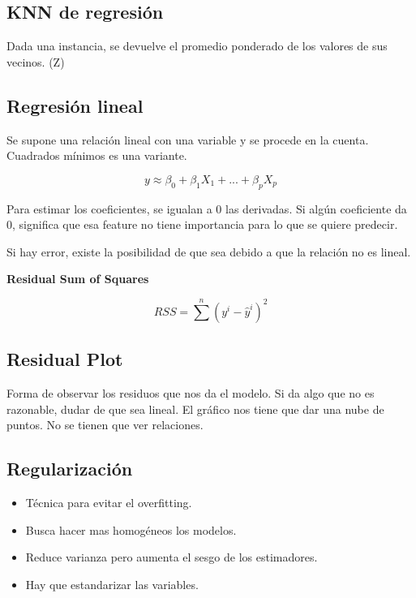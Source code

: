 \documentclass[titlepage,a4paper]{article}
\begin{document}

\subsection{KNN de regresión}
Dada una instancia, se devuelve el promedio ponderado de los valores de sus vecinos. (Z)


\subsection{Regresión lineal}
Se supone una relación lineal con una variable y se procede en la cuenta. Cuadrados mínimos es una variante.

\begin{equation}
    y \approx \beta_0 + \beta_1 X_1 + ... + \beta_p X_p
\end{equation}

Para estimar los coeficientes, se igualan a 0 las derivadas. Si algún coeficiente da 0, significa que esa feature no tiene importancia para lo que se quiere predecir.

Si hay error, existe la posibilidad de que sea debido a que la relación no es lineal.

\textbf{Residual Sum of Squares}

\begin{equation}
    RSS = \sum^{n} (y^{i}-\hat{y}^{i})^{2}
\end{equation}


\subsection{Residual Plot}

Forma de observar los residuos que nos da el modelo. Si da algo que no es razonable, dudar de que sea lineal. El gráfico nos tiene que dar una nube de puntos. No se tienen que ver relaciones.



\subsection{Regularización}
\begin{itemize}
    \item Técnica para evitar el overfitting.
    \item Busca hacer mas homogéneos los modelos.
    \item Reduce varianza pero aumenta el sesgo de los estimadores.
    \item Hay que estandarizar las variables.
\end{itemize}
\end{document}
